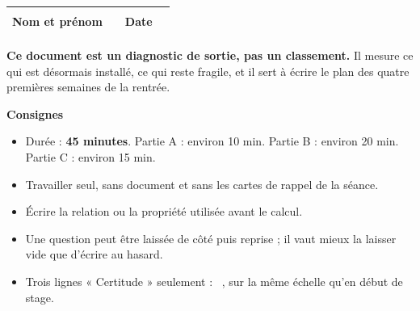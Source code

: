 \documentclass[10pt,a4paper]{article}
\begin{document}
\par\noindent\begin{tabularx}{\linewidth}{>{\bfseries}p{22mm} X >{\bfseries}p{16mm} X}
\toprule Nom et prénom & \rule{62mm}{0.32pt} & Date & \rule{34mm}{0.32pt} \\ \bottomrule
\end{tabularx}

\begin{goalbox}
\textbf{Ce document est un diagnostic de sortie, pas un classement.} Il mesure ce qui est
désormais installé, ce qui reste fragile, et il sert à écrire le plan des quatre premières
semaines de la rentrée.
\end{goalbox}

\begin{methodbox}
\textbf{Consignes}
\begin{itemize}
\item Durée : \textbf{45 minutes}. Partie A : environ 10 min. Partie B : environ 20 min. Partie C : environ 15 min.
\item Travailler seul, sans document et sans les cartes de rappel de la séance.
\item Écrire la relation ou la propriété utilisée avant le calcul.
\item Une question peut être laissée de côté puis reprise ; il vaut mieux la laisser vide que d'écrire au hasard.
\item Trois lignes « Certitude » seulement : \conf\ , sur la même échelle qu'en début de stage.
\end{itemize}
\end{methodbox}
\end{document}
